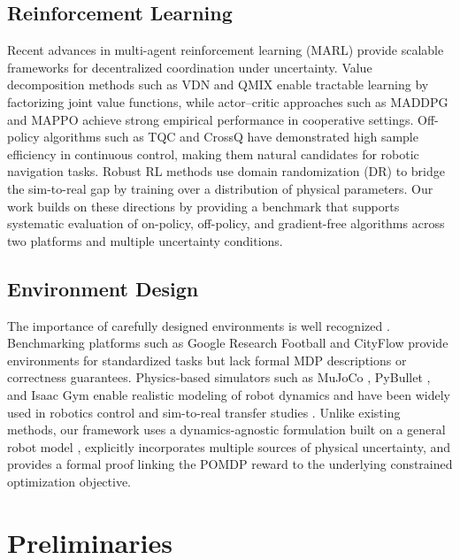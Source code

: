 \documentclass{article}
\begin{document}
\subsection{Reinforcement Learning}
Recent advances in multi-agent reinforcement learning (MARL) provide scalable frameworks for decentralized coordination under uncertainty. Value decomposition methods such as VDN \citep{sunehag2018vdn} and QMIX \citep{rashid2018qmix, rashid2020qmix} enable tractable learning by factorizing joint value functions, while actor--critic approaches such as MADDPG \citep{lowe2017maddpg} and MAPPO \citep{yu2022mappo} achieve strong empirical performance in cooperative settings. Off-policy algorithms such as TQC \citep{kuznetsov2020tqc} and CrossQ \citep{bhatt2024crossq} have demonstrated high sample efficiency in continuous control, making them natural candidates for robotic navigation tasks. Robust RL methods \citep{peng2018sim2real, tobin2017domain} use domain randomization (DR) to bridge the sim-to-real gap by training over a distribution of physical parameters. Our work builds on these directions by providing a benchmark that supports systematic evaluation of on-policy, off-policy, and gradient-free algorithms across two platforms and multiple uncertainty conditions.

\subsection{Environment Design}
The importance of carefully designed environments is well recognized \citep{reda2020learning, cobbe2020icml, dulac2020empirical, sutton2018reinforcement, henderson2018deep}. Benchmarking platforms such as Google Research Football \citep{kurach2020google} and CityFlow \citep{zhang2019cityflow} provide environments for standardized tasks but lack formal MDP descriptions or correctness guarantees. Physics-based simulators such as MuJoCo \citep{todorov2012mujoco}, PyBullet \citep{coumans2021pybullet}, and Isaac Gym \citep{makoviychuk2021isaac} enable realistic modeling of robot dynamics and have been widely used in robotics control and sim-to-real transfer studies \citep{tassa2018deepmind, akkaya2019solving, tobin2017domain}. Unlike existing methods, our framework uses a dynamics-agnostic formulation built on a general robot model \citep{plaku2021}, explicitly incorporates multiple sources of physical uncertainty, and provides a formal proof linking the POMDP reward to the underlying constrained optimization objective.

\section{Preliminaries}
\end{document}
